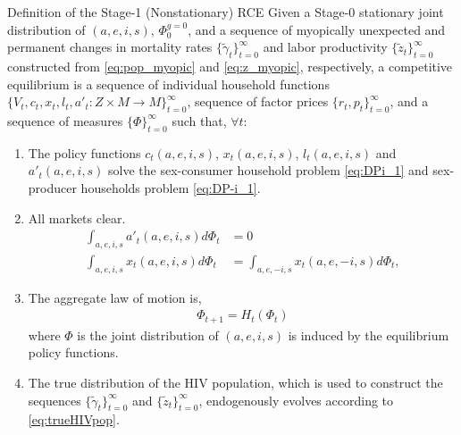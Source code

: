 \begin{myexampleblock}{Definition of the Stage-1 (Nonstationary) RCE}
Given a Stage-0 stationary joint distribution of $(a,e,i,s)$, $\Phi^{g=0}_{0}$, and a sequence of myopically unexpected and permanent changes in mortality rates $\{ \widetilde{\gamma}_{t} \}_{t=0}^\infty$ and labor productivity $\{\widetilde{z}_t\}_{t=0}^\infty$ constructed from \eqref{eq:pop_myopic} and \eqref{eq:z_myopic}, respectively, a competitive equilibrium is a sequence of individual household functions $\{V_t,c_t,x_t,l_t,a'_{t}: Z \times M \rightarrow M\}_{t=0}^\infty$, sequence of factor prices $\{r_t,p_t\}_{t=0}^\infty$, and a sequence of measures $\{\Phi\}_{t=0}^\infty$ such that, $\forall t$:
\begin{enumerate}
    \item The policy functions $c_t(a,e,i,s)$, $x_t(a,e,i,s)$, $l_t(a,e,i,s)$ and $a'_t(a,e,i,s)$ solve the sex-consumer household problem \eqref{eq:DPi_1} and sex-producer households problem \eqref{eq:DP-i_1}.
\item All markets clear.
 \begin{align*}
\int_{a,e,i,s} a'_t(a,e,i,s) d\Phi_t &= 0 \\
\int_{a,e,i,s} x_t(a,e,i,s) d \Phi_t &= \int_{a,e,-i,s} x_t(a,e,-i,s) d\Phi_t,
\end{align*}
 \item The aggregate law of motion is,
 \begin{align*}
     \Phi_{t+1} = H_t(\Phi_t)
 \end{align*}
 where $\Phi$ is the joint distribution of $(a,e,i,s)$ is induced by the equilibrium policy functions.
 \item The true distribution of the HIV population, which is used to construct the sequences $\{ \widetilde{\gamma}_{t} \}_{t=0}^\infty$ and $\{\widetilde{z}_t\}_{t=0}^\infty$, endogenously evolves according to \eqref{eq:trueHIVpop}.
 \end{enumerate}
\end{myexampleblock}

